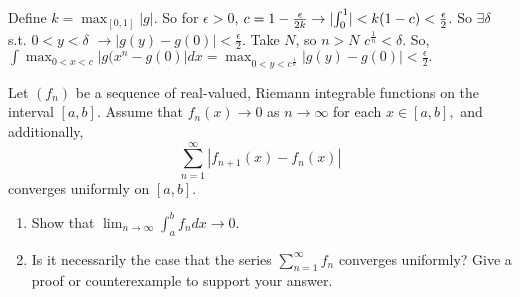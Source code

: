 \documentclass[12pt,letterpaper,boxed]{hmcpset}
\DeclarePairedDelimiter\abs{\lvert}{\rvert}%
\begin{document}
\begin{solution}
Define $k = \max_{[0,1]} |g|$. So for $\epsilon > 0$, $c=1 - \frac{\epsilon}{2k}\rightarrow \abs{\int_{0}^{1}}<k(1-c)<\frac{\epsilon}{2}$. So $\exists \delta$ s.t. $0 < y< \delta$ $\rightarrow |g(y) - g(0)| < \frac{\epsilon}{2}$. Take $N$, so $n > N$ $c^{\frac{1}{n}} < \delta$. So, $\int \max_{0 < x < c}|g(x^{n}-g(0)|dx=\max_{0 < y < c^{\frac{1}{n}} }|g(y)-g(0)| < \frac{\epsilon}{2}.$
\end{solution}

\begin{problem}[Exercise 3.3]
Let $(f_n)$ be a sequence of real-valued, Riemann integrable functions on the interval $[a,b]$. Assume that $f_{n}(x)\rightarrow 0$ as $n\rightarrow\infty$ for each $x\in[a,b],$ and additionally, $$\sum_{n=1}^{\infty}|f_{n + 1}(x) - f_{n}(x)|$$ converges uniformly on $[a,b]$.
\begin{enumerate}
    \item Show that $\lim_{n \rightarrow\infty}\int_{a}^{b}f_n dx \rightarrow 0.$
    \item Is it necessarily the case that the series $\sum_{n=1}^{\infty}f_n$ converges uniformly? Give a proof or counterexample to support your answer.
\end{enumerate}
\end{problem}

\begin{solution}
\end{solution}
\end{document}
